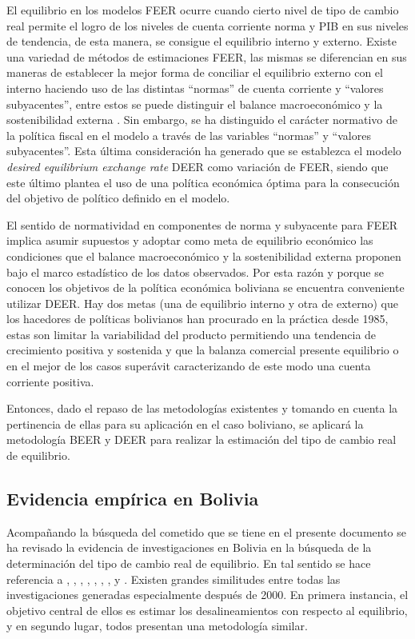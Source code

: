 \documentclass[12pt,letterpaper]{article}
\begin{document}
El equilibrio en los modelos FEER ocurre cuando cierto nivel de tipo de cambio real permite el logro de los niveles de cuenta corriente norma y PIB en sus niveles de tendencia, de esta manera, se consigue el equilibrio interno y externo. Existe una variedad de métodos de estimaciones FEER, las mismas se diferencian en sus maneras de establecer la mejor forma de conciliar el equilibrio externo con el interno haciendo uso de las distintas ``normas'' de cuenta corriente y ``valores subyacentes'', entre estos se puede distinguir el balance macroeconómico y la sostenibilidad externa \citep{bussiere2010methodological}. Sin embargo, se ha distinguido el carácter normativo de la política fiscal en el modelo a través de las variables ``normas'' y ``valores subyacentes''. Esta última consideración ha generado que se establezca el modelo \emph{desired equilibrium exchange rate} DEER como variación de FEER, siendo que este último plantea el uso de una política económica óptima para la consecución del objetivo de político definido en el modelo.

El sentido de normatividad en componentes de norma y subyacente para FEER implica asumir supuestos y adoptar como meta de equilibrio económico las condiciones que el balance macroeconómico y la sostenibilidad externa proponen bajo el marco estadístico de los datos observados. Por esta razón y porque se conocen los objetivos de la política económica boliviana se encuentra conveniente utilizar DEER. Hay dos metas (una de equilibrio interno y otra de externo) que los hacedores de políticas bolivianos han procurado en la práctica desde 1985, estas son limitar la variabilidad del producto permitiendo una tendencia de crecimiento positiva y sostenida y que la balanza comercial presente equilibrio o en el mejor de los casos superávit caracterizando de este modo una cuenta corriente positiva.

Entonces, dado el repaso de las metodologías existentes y tomando en cuenta la pertinencia de ellas para su aplicación en el caso boliviano, se aplicará la metodología BEER y DEER para realizar la estimación del tipo de cambio real de equilibrio. 

\subsection*{Evidencia empírica en Bolivia}
Acompañando la búsqueda del cometido que se tiene en el presente documento se ha revisado la evidencia de investigaciones en Bolivia en la búsqueda de la determinación del tipo de cambio real de equilibrio. En tal sentido se hace referencia a \cite{ferrufino1992tipo}, \cite{marquez2003estimacion}, \cite{humerez2005reexaminando}, \cite{montiel2007equilibrium}, \cite{cerutti2008bolivia}, \cite{mendieta2008equilibrio}, \cite{bello2010tipo}, \cite{cerezo2010desempeno} y \cite{cerezo2011tipo}. Existen grandes similitudes entre todas las investigaciones generadas especialmente después de 2000. En primera instancia, el objetivo central de ellos es estimar los desalineamientos con respecto al equilibrio, y en segundo lugar, todos presentan una metodología similar.
\end{document}
